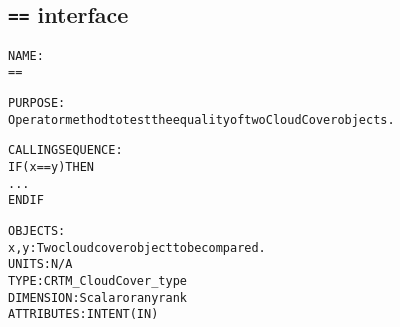 \subsection{\texttt{==} interface}
  \label{sec:==_interface}
  \begin{alltt}
 
  NAME:
    ==
 
  PURPOSE:
    Operator method to test the equality of two CloudCover objects.
 
  CALLING SEQUENCE:
    IF ( x == y ) THEN
      ...
    END IF
 
  OBJECTS:
    x, y:  Two cloud cover object to be compared.
           UNITS:      N/A
           TYPE:       CRTM_CloudCover_type
           DIMENSION:  Scalar or any rank
           ATTRIBUTES: INTENT(IN)
 
  \end{alltt}
